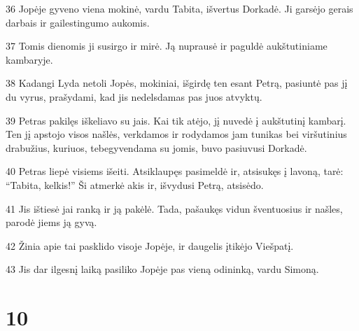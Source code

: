 \par 36 Jopėje gyveno viena mokinė, vardu Tabita, išvertus Dorkadė. Ji garsėjo gerais darbais ir gailestingumo aukomis. 
\par 37 Tomis dienomis ji susirgo ir mirė. Ją nuprausė ir paguldė aukštutiniame kambaryje. 
\par 38 Kadangi Lyda netoli Jopės, mokiniai, išgirdę ten esant Petrą, pasiuntė pas jį du vyrus, prašydami, kad jis nedelsdamas pas juos atvyktų. 
\par 39 Petras pakilęs iškeliavo su jais. Kai tik atėjo, jį nuvedė į aukštutinį kambarį. Ten jį apstojo visos našlės, verkdamos ir rodydamos jam tunikas bei viršutinius drabužius, kuriuos, tebegyvendama su jomis, buvo pasiuvusi Dorkadė. 
\par 40 Petras liepė visiems išeiti. Atsiklaupęs pasimeldė ir, atsisukęs į lavoną, tarė: “Tabita, kelkis!” Ši atmerkė akis ir, išvydusi Petrą, atsisėdo. 
\par 41 Jis ištiesė jai ranką ir ją pakėlė. Tada, pašaukęs vidun šventuosius ir našles, parodė jiems ją gyvą. 
\par 42 Žinia apie tai pasklido visoje Jopėje, ir daugelis įtikėjo Viešpatį. 
\par 43 Jis dar ilgesnį laiką pasiliko Jopėje pas vieną odininką, vardu Simoną.


\chapter{10}


